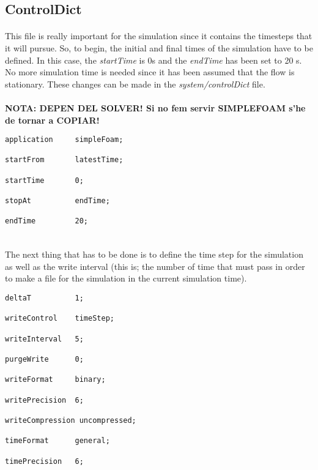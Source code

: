 \subsection{ControlDict}
\paragraph{}This file is really important for the simulation since it contains the timesteps that it will pursue. So, to begin, the initial and final times of the simulation have to be defined. In this case, the \textit{startTime} is 0s and the \textit{endTime} has been set to 20 s. No more simulation time is needed since it has been assumed that the flow is stationary. These changes can be made in the \textit{system/controlDict} file.

\paragraph{}\textbf{NOTA: DEPEN DEL SOLVER! Si no fem servir SIMPLEFOAM s'he de tornar a COPIAR!}

\begin{footnotesize}
\begin{verbatim}
application     simpleFoam;

startFrom       latestTime;

startTime       0;

stopAt          endTime;

endTime         20;


\end{verbatim}
\end{footnotesize}

\paragraph{}The next thing that has to be done is to define the time step for the simulation as well as the write interval (this is; the number of time that must pass in order to make a file for the simulation in the current simulation time). 

\begin{footnotesize}
\begin{verbatim}
deltaT          1;

writeControl    timeStep;

writeInterval   5;

purgeWrite      0;

writeFormat     binary;

writePrecision  6;

writeCompression uncompressed;

timeFormat      general;

timePrecision   6;

\end{verbatim}
\end{footnotesize}

